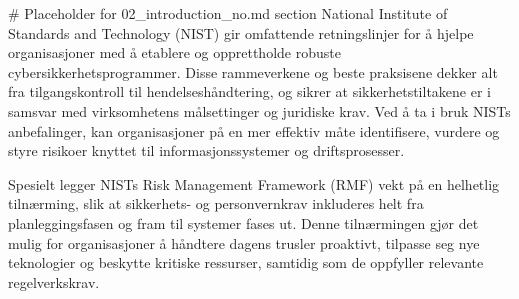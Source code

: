 # Placeholder for 02_introduction_no.md section
National Institute of Standards and Technology (NIST) gir omfattende retningslinjer for å hjelpe organisasjoner med å etablere og opprettholde robuste cybersikkerhetsprogrammer. Disse rammeverkene og beste praksisene dekker alt fra tilgangskontroll til hendelseshåndtering, og sikrer at sikkerhetstiltakene er i samsvar med virksomhetens målsettinger og juridiske krav. Ved å ta i bruk NISTs anbefalinger, kan organisasjoner på en mer effektiv måte identifisere, vurdere og styre risikoer knyttet til informasjonssystemer og driftsprosesser.

Spesielt legger NISTs Risk Management Framework (RMF) vekt på en helhetlig tilnærming, slik at sikkerhets- og personvernkrav inkluderes helt fra planleggingsfasen og fram til systemer fases ut. Denne tilnærmingen gjør det mulig for organisasjoner å håndtere dagens trusler proaktivt, tilpasse seg nye teknologier og beskytte kritiske ressurser, samtidig som de oppfyller relevante regelverkskrav.